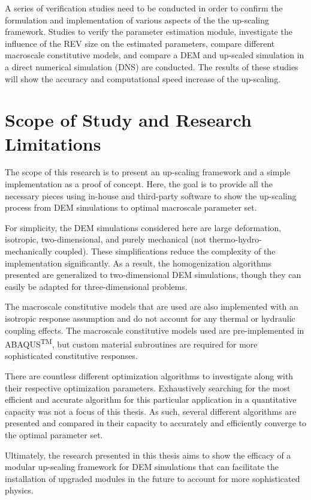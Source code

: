 A series of verification studies need to be conducted in order to confirm the formulation and implementation of various aspects of the the up-scaling framework. Studies to verify the parameter estimation module, investigate the influence of the REV size on the estimated parameters, compare different macroscale constitutive models, and compare a DEM and up-scaled simulation in a direct numerical simulation (DNS) are conducted. The results of these studies will show the accuracy and computational speed increase of the up-scaling.

\section{Scope of Study and Research Limitations}

The scope of this research is to present an up-scaling framework and a simple implementation as a proof of concept. Here, the goal is to provide all the necessary pieces using in-house and third-party software to show the up-scaling process from DEM simulations to optimal macroscale parameter set. 

For simplicity, the DEM simulations considered here are large deformation, isotropic, two-dimensional, and purely mechanical (not thermo-hydro-mechanically coupled). These simplifications reduce the complexity of the implementation significantly. As a result, the homogenization algorithms presented are generalized to two-dimensional DEM simulations, though they can easily be adapted for three-dimensional problems.

The macroscale constitutive models that are used are also implemented with an isotropic response assumption and do not account for any thermal or hydraulic coupling effects. The macroscale constitutive models used are pre-implemented in ABAQUS\textsuperscript{TM}, but custom material subroutines are required for more sophisticated constitutive responses. 

There are countless different optimization algorithms to investigate along with their respective optimization parameters. Exhaustively searching for the most efficient and accurate algorithm for this particular application in a quantitative capacity was not a focus of this thesis. As such, several different algorithms are presented and compared in their capacity to accurately and efficiently converge to the optimal parameter set.

Ultimately, the research presented in this thesis aims to show the efficacy of a modular up-scaling framework for DEM simulations that can facilitate the installation of upgraded modules in the future to account for more sophisticated physics.
